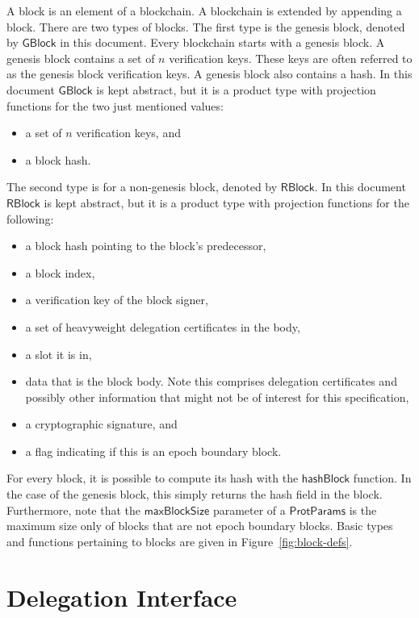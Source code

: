 \documentclass[11pt,a4paper]{article}
\newcommand{\fun}[1]{\mathsf{#1}}
\newcommand{\type}[1]{\mathsf{#1}}
\newcommand{\GBlock}{\type{GBlock}}
\newcommand{\RBlock}{\type{RBlock}}
\newcommand{\ProtParams}{\type{ProtParams}} %
\newcommand{\hashofblockname}{hashBlock}
\newcommand{\maxblocksizename}{maxBlockSize}
\begin{document}
A block is an element of a blockchain.
%
A blockchain is extended by appending a block.
%
There are two types of blocks.
%
The first type is the genesis block, denoted by $\GBlock$ in this document.
%
Every blockchain starts with a genesis block.
%
A genesis block contains a set of $n$ verification keys.
%
These keys are often referred to as the genesis block verification keys.
%
A genesis block also contains a hash.
%
In this document $\GBlock$ is kept abstract, but it is a product type with
projection functions for the two just mentioned values:
%
\begin{itemize}
\item a set of $n$ verification keys, and
\item a block hash.
\end{itemize}

The second type is for a non-genesis block, denoted by $\RBlock$.
%
In this document $\RBlock$ is kept abstract, but it is a product type with
projection functions for the following:
%
\begin{itemize}
\item a block hash pointing to the block's predecessor,
\item a block index,
\item a verification key of the block signer,
\item a set of heavyweight delegation certificates in the body,
\item a slot it is in,
\item data that is the block body. Note this comprises delegation certificates
  and possibly other information that might not be of interest for this
  specification,
\item a cryptographic signature, and
\item a flag indicating if this is an epoch boundary block.
\end{itemize}


For every block, it is possible to compute its hash with the
$\fun{\hashofblockname}$ function.
%
In the case of the genesis block, this simply returns the hash field in the
block.
%
Furthermore, note that the $\fun{\maxblocksizename}$ parameter of a
$\ProtParams$ is the maximum size only of blocks that are not epoch boundary
blocks.
%
Basic types and functions pertaining to blocks are given in
Figure~\ref{fig:block-defs}.


\section{Delegation Interface}
\label{sec:del-interface}
\end{document}
